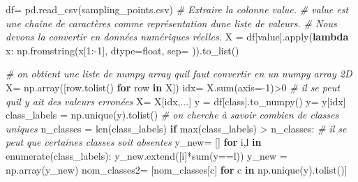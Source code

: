 \documentclass[
]{article}
\newenvironment{Shaded}{}{}
\newcommand{\BuiltInTok}[1]{\textcolor[rgb]{0.00,0.50,0.00}{#1}}
\newcommand{\CommentTok}[1]{\textcolor[rgb]{0.38,0.63,0.69}{\textit{#1}}}
\newcommand{\ControlFlowTok}[1]{\textcolor[rgb]{0.00,0.44,0.13}{\textbf{#1}}}
\newcommand{\DecValTok}[1]{\textcolor[rgb]{0.25,0.63,0.44}{#1}}
\newcommand{\KeywordTok}[1]{\textcolor[rgb]{0.00,0.44,0.13}{\textbf{#1}}}
\newcommand{\NormalTok}[1]{#1}
\newcommand{\OperatorTok}[1]{\textcolor[rgb]{0.40,0.40,0.40}{#1}}
\newcommand{\StringTok}[1]{\textcolor[rgb]{0.25,0.44,0.63}{#1}}
\begin{document}
\label{7dfb466e}
\label{cb25}
\begin{Shaded}
\begin{Highlighting}[]
\NormalTok{df}\OperatorTok{=}\NormalTok{ pd.read\_csv(}\StringTok{\textquotesingle{}sampling\_points.csv\textquotesingle{}}\NormalTok{)}
\CommentTok{\# Extraire la colonne \textquotesingle{}value\textquotesingle{}.}
\CommentTok{\# \textquotesingle{}value\textquotesingle{} est une chaîne de caractères comme représentation d\textquotesingle{}une liste de valeurs.}
\CommentTok{\# Nous devons la convertir en données numériques réelles.}
\NormalTok{X }\OperatorTok{=}\NormalTok{ df[}\StringTok{\textquotesingle{}value\textquotesingle{}}\NormalTok{].}\BuiltInTok{apply}\NormalTok{(}\KeywordTok{lambda}\NormalTok{ x: np.fromstring(x[}\DecValTok{1}\NormalTok{:}\OperatorTok{{-}}\DecValTok{1}\NormalTok{], dtype}\OperatorTok{=}\BuiltInTok{float}\NormalTok{, sep}\OperatorTok{=}\StringTok{\textquotesingle{} \textquotesingle{}}\NormalTok{)).to\_list()}

\CommentTok{\# on obtient une liste de numpy array  qu\textquotesingle{}il faut convertir en un numpy array 2D}
\NormalTok{X}\OperatorTok{=}\NormalTok{ np.array([row.tolist() }\ControlFlowTok{for}\NormalTok{ row }\KeywordTok{in}\NormalTok{ X])}
\NormalTok{idx}\OperatorTok{=}\NormalTok{ X.}\BuiltInTok{sum}\NormalTok{(axis}\OperatorTok{={-}}\DecValTok{1}\NormalTok{)}\OperatorTok{\textgreater{}}\DecValTok{0} \CommentTok{\# il se peut qu\textquotesingle{}il y ait des valeurs erronées}
\NormalTok{X}\OperatorTok{=}\NormalTok{ X[idx,...]}
\NormalTok{y }\OperatorTok{=}\NormalTok{ df[}\StringTok{\textquotesingle{}class\textquotesingle{}}\NormalTok{].to\_numpy()}
\NormalTok{y}\OperatorTok{=}\NormalTok{ y[idx]}
\NormalTok{class\_labels }\OperatorTok{=}\NormalTok{ np.unique(y).tolist() }\CommentTok{\# on cherche à savoir combien de classes uniques}
\NormalTok{n\_classes }\OperatorTok{=} \BuiltInTok{len}\NormalTok{(class\_labels)}
\ControlFlowTok{if} \BuiltInTok{max}\NormalTok{(class\_labels) }\OperatorTok{\textgreater{}}\NormalTok{ n\_classes: }\CommentTok{\# il se peut que certaines classes soit absentes}
\NormalTok{  y\_new}\OperatorTok{=}\NormalTok{ []}
  \ControlFlowTok{for}\NormalTok{ i,l }\KeywordTok{in} \BuiltInTok{enumerate}\NormalTok{(class\_labels):}
\NormalTok{    y\_new.extend([i]}\OperatorTok{*}\BuiltInTok{sum}\NormalTok{(y}\OperatorTok{==}\NormalTok{l))}
\NormalTok{  y\_new }\OperatorTok{=}\NormalTok{ np.array(y\_new)}
\NormalTok{nom\_classes2}\OperatorTok{=}\NormalTok{ [nom\_classes[c] }\ControlFlowTok{for}\NormalTok{ c }\KeywordTok{in}\NormalTok{ np.unique(y).tolist()]}
\end{Highlighting}
\end{Shaded}
\end{document}
